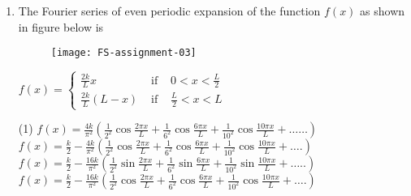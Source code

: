 \begin{enumerate}
\begin{answer}
\begin{align*}
	\text{For }n&=1\\
	b_{1}&=\frac{E_{0} \omega}{2 \pi} \int_{0}^{\pi / \omega}[1-\cos 2 \omega t] d t=\frac{E_{0} \omega}{2 \pi} \int_{0}^{\pi / \omega}\left[t-\frac{\sin 2 \omega t}{2 \omega}\right]_{0}^{\pi / \omega}=\frac{E_{0} \omega}{2 \pi} \frac{\pi}{\omega}=\frac{E_{0}}{2}\\
	\text{For }n&=2,3,4 \ldots .\\
	\Rightarrow b_{n}&=\frac{E_{0} \omega}{2 \pi}\left[-\frac{\sin (1+n) \omega t}{(1+n) \omega}+\frac{\sin (1-n) \omega t}{(1-n) \omega}\right]_{0}^{\pi / \omega}=\frac{E_{0}}{2 \pi}\left[\frac{-\sin (1+n) \pi}{(1+n)}+\frac{\sin (1-n) \pi}{(1-n)}\right]=0
	\intertext{Thus Fourier series}
	f(t)&=a_{0}+b_{1} \sin \omega t+\sum_{n=2,4}^{\infty} a_{n} \cos n \omega t=a_{0}+b_{1} \sin \omega t+\sum_{n=2,4 \ldots}^{\infty} \frac{2 E_{0}}{\pi\left(1-n^{2}\right)} \cos n \omega t
	\end{align*}
		So the correct option is \textbf{Option (a)}
\end{answer}
	\item  The Fourier series of even periodic expansion of the function $f(x)$ as shown in figure below is
	\begin{figure}[H]
		\centering
		\texttt{[image: FS-assignment-03]}
	\end{figure}
	$f(x)=\left\{\begin{array}{clc}\frac{2 k}{L} x & \text { if } & 0<x<\frac{L}{2} \\ \frac{2 k}{L}(L-x) & \text { if } & \frac{L}{2}<x<L\end{array}\right.$
	 \begin{tasks}(1)
		\task[\textbf{a.}]$f(x)=\frac{4 k}{\pi^{2}}\left(\frac{1}{2^{2}} \cos \frac{2 \pi x}{L}+\frac{1}{6^{2}} \cos \frac{6 \pi x}{L}+\frac{1}{10^{2}} \cos \frac{10 \pi x}{L}+\ldots \ldots\right)$
		\task[\textbf{b.}]$f(x)=\frac{k}{2}-\frac{4 k}{\pi^{2}}\left(\frac{1}{2^{2}} \cos \frac{2 \pi x}{L}+\frac{1}{6^{2}} \cos \frac{6 \pi x}{L}+\frac{1}{10^{2}} \cos \frac{10 \pi x}{L}+\ldots .\right)$
		\task[\textbf{c.}]$f(x)=\frac{k}{2}-\frac{16 k}{\pi^{2}}\left(\frac{1}{2^{2}} \sin \frac{2 \pi x}{L}+\frac{1}{6^{2}} \sin \frac{6 \pi x}{L}+\frac{1}{10^{2}} \sin \frac{10 \pi x}{L}+\ldots . .\right)$
		\task[\textbf{d.}] $f(x)=\frac{k}{2}-\frac{16 k}{\pi^{2}}\left(\frac{1}{2^{2}} \cos \frac{2 \pi x}{L}+\frac{1}{6^{2}} \cos \frac{6 \pi x}{L}+\frac{1}{10^{2}} \cos \frac{10 \pi x}{L}+\ldots .\right)$
	\end{tasks}
\begin{answer}

\end{answer}
\end{enumerate}
